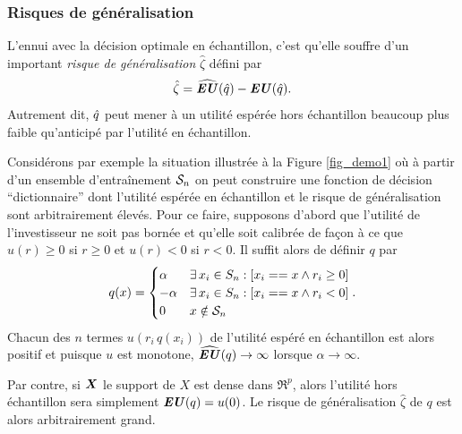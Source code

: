 \subsubsection{Risques de généralisation}
\label{intro:risk}

L'ennui avec la décision optimale en échantillon, c'est qu'elle souffre d'un important
\textit{risque de généralisation} $\hat\zeta$ défini par
\begin{equation}
  \hat\zeta = \hEU(\qh) - \EU(\qh).
\end{equation}
Autrement dit, $\qh$ peut mener à un utilité espérée hors échantillon beaucoup plus faible
qu'anticipé par l'utilité en échantillon.

Considérons par exemple la situation illustrée à la Figure \ref{fig_demo1} où à partir
d'un ensemble d'entraînement $\S_n$ on peut construire une fonction de décision
``dictionnaire'' dont l'utilité espérée en échantillon et le risque de généralisation sont
arbitrairement élevés. Pour ce faire, supposons d'abord que l'utilité de l'investisseur ne
soit pas bornée et qu'elle soit calibrée de façon à ce que $u(r) \geq 0$ si $r \geq 0$ et
$u(r) < 0$ si $r < 0$. Il suffit alors de définir $q$ par
\begin{equation}
  q(x) =
  \begin{cases}
     \alpha & \exists\,x_i \in S_n: [x_i == x \wedge r_i \geq 0]\\
    -\alpha & \exists\,x_i \in S_n: [x_i == x \wedge r_i < 0]\\
     0 & x \notin \S_n
  \end{cases}.
\end{equation}
Chacun des $n$ termes $u(r_i\,q(x_i))$ de l'utilité espéré en échantillon est alors
positif et puisque $u$ est monotone, $\hEU(q) \to \infty$ lorsque $\alpha\to\infty$.

Par contre, si $\X$ le support de $X$ est dense dans $\Re^p$, alors l'utilité hors
échantillon sera simplement $\EU(q) = u(0)$. Le risque de généralisation $\hat\zeta$ de
$q$ est alors arbitrairement grand.

